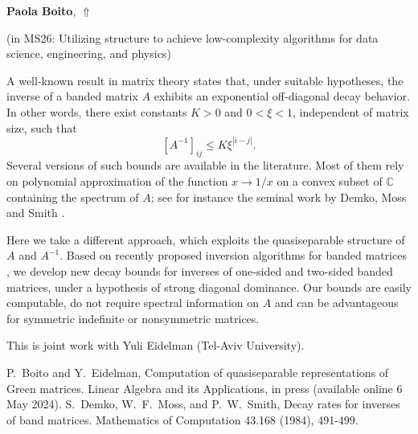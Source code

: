 \documentclass[ILAS2025-program.tex]{subfiles}
\begin{document}
\hypertarget{down0025}{}\begin{ilasabstract}
    
\textbf{Paola Boito},  \hfill \hyperlink{up0025}{$\Uparrow$}
    
    
(in {\color{mstitle}MS26: Utilizing structure to achieve low-complexity algorithms for data science, engineering, and physics})
        
\mtskip
    \begin{bibunit}
        A well-known result in matrix theory states that, under suitable hypotheses, the inverse of a banded matrix $A$ exhibits an exponential off-diagonal decay behavior. In other words, there exist constants $K>0$ and $0<\xi<1$, independent of matrix size, such that 
$$
[A^{-1}]_{ij}\leq K \xi^{|i-j|}.
$$
Several versions of such bounds are available in the literature. Most of them rely on polynomial approximation of the function $x\rightarrow 1/x$ on a convex subset of $\mathbb{C}$ containing the spectrum of $A$; see for instance the seminal work by Demko, Moss and Smith \cite{DMS84}.

Here we take a different approach, which exploits the quasiseparable structure of $A$ and $A^{-1}$. Based on recently proposed inversion algorithms for banded matrices \cite{BE23}, we develop new decay bounds for inverses of one-sided and two-sided banded matrices, under a hypothesis of strong diagonal dominance. Our bounds are easily computable, do not require spectral information on $A$ and can be advantageous for symmetric indefinite or nonsymmetric matrices.

This is joint work with Yuli Eidelman (Tel-Aviv University). 


\begin{thebibliography}{99}
P.~Boito and Y.~Eidelman, Computation of quasiseparable representations of Green matrices. Linear Algebra and its Applications, in press (available online 6 May 2024).
S.~Demko, W.~F.~Moss, and P.~W.~Smith,
Decay rates for inverses of band matrices. Mathematics of Computation 43.168 (1984), 491-499.
\end{thebibliography}


        \end{bibunit}
        
\end{ilasabstract}
    
\end{document}
